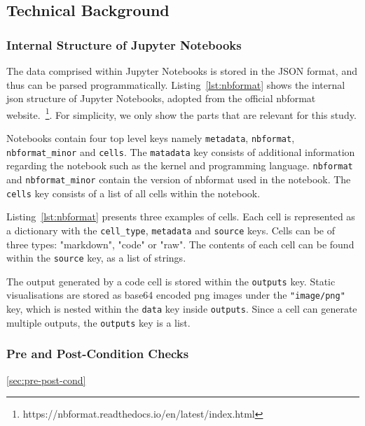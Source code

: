 \documentclass[acmsmall,screen,review,anonymous]{acmart}
\begin{document}
\subsection{Technical Background}\label{sec:background}
\subsubsection{Internal Structure of Jupyter Notebooks}\label{sec:nbformat}


\label{lst:nbformat}

The data comprised within Jupyter Notebooks is stored in the JSON format, and thus can be parsed programmatically. Listing~\ref{lst:nbformat} shows the internal json structure of Jupyter Notebooks, adopted from the official nbformat website.~\footnote{https://nbformat.readthedocs.io/en/latest/index.html}. For simplicity, we only show the parts that are relevant for this study.

Notebooks contain four top level keys namely \texttt{metadata}, \texttt{nbformat}, \texttt{nbformat\_minor} and \texttt{cells}. The \texttt{matadata} key consists of additional information regarding the notebook such as the kernel and programming language. \texttt{nbformat} and \texttt{nbformat\_minor} contain the version of nbformat used in the notebook. The \texttt{cells} key consists of a list of all cells within the notebook.

Listing~\ref{lst:nbformat} presents three examples of cells. Each cell is represented as a dictionary with the \texttt{cell\_type}, \texttt{metadata} and \texttt{source} keys. Cells can be of three types: "markdown", "code" or "raw". The contents of each cell can be found within the \texttt{source} key, as a list of strings.

The output generated by a code cell is stored within the \texttt{outputs} key. Static visualisations are stored as base64 encoded png images under the \texttt{"image/png"} key, which is nested within the \texttt{data} key inside \texttt{outputs}. Since a cell can generate multiple outputs, the \texttt{outputs} key is a list.

\subsubsection{Pre and Post-Condition Checks}\ref{sec:pre-post-cond}
\end{document}
